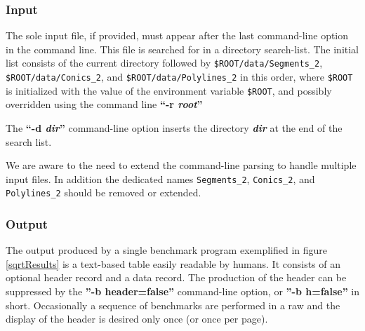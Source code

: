 
\subsubsection{Input}
The sole input file, if provided, must appear after the last
command-line option in the command line. This file is searched for in
a directory search-list. The initial list consists of the current
directory followed by {\tt \$ROOT/data/Segments\_2},
{\tt \$ROOT/data/Conics\_2}, and {\tt \$ROOT/data/Polylines\_2} in
this order, where {\tt \$ROOT} is initialized with the value of the
environment variable {\tt \$ROOT}, and possibly overridden using the
command line \textbf{``-r {\em root}''}

The \textbf{``-d {\em dir}''} command-line option inserts the
directory \textbf{\em dir} at the end of the search list.

We are aware to the need to extend the command-line parsing to handle
multiple input files. In addition the dedicated names
{\tt Segments\_2}, {\tt Conics\_2}, and {\tt Polylines\_2} should be
removed or extended.

\subsubsection{Output}
The output produced by a single benchmark program exemplified in
figure \ref{sqrtResults} is a text-based table easily readable by
humans. It consists of an optional header record and a data
record. The production of the header can be suppressed by the
\textbf{''-b header=false''} command-line option, or
\textbf{''-b h=false''} in short. Occasionally a sequence of
benchmarks are performed in a raw and the display of the header is
desired only once (or once per page).

